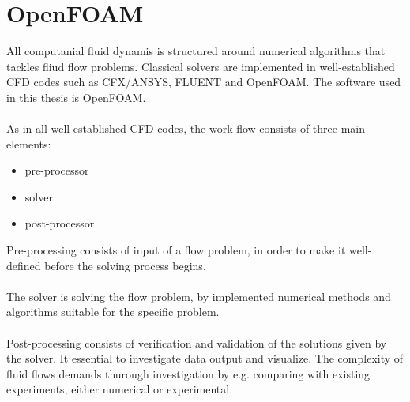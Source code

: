 \documentclass[a4paper, 12pt]{report}
\begin{document}
\chapter{OpenFOAM}
All computanial fluid dynamis is structured around numerical algorithms that tackles fliud flow problems. Classical solvers are implemented in well-established CFD codes such as CFX/ANSYS, FLUENT and OpenFOAM. The software used in this thesis is OpenFOAM.\\
\\   
As in all well-established CFD codes, the work flow consists of three main elements:
\begin{itemize}
\item pre-processor
\item solver
\item post-processor
\end{itemize}
Pre-processing consists of input of a flow problem, in order to make it well-defined before the solving process begins.\\
\\
The solver is solving the flow problem, by implemented numerical methods and algorithms suitable for the specific problem. \\
\\
Post-processing consists of verification and validation of the solutions given by the solver. It essential to investigate data output and visualize. The complexity of fluid flows demands thurough investigation by e.g. comparing with existing experiments, either numerical or experimental.\\
\\
\end{document}
